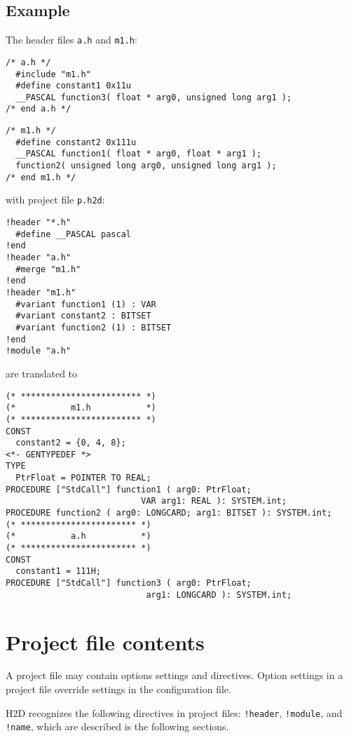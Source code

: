 \subsection*{Example}

The header files {\tt a.h} and {\tt m1.h}:

{\ifonline\else\small\fi
\begin{verbatim}
/* a.h */
  #include "m1.h"
  #define constant1 0x11u
  __PASCAL function3( float * arg0, unsigned long arg1 );
/* end a.h */
\end{verbatim}

\begin{verbatim}
/* m1.h */
  #define constant2 0x111u
  __PASCAL function1( float * arg0, float * arg1 );
  function2( unsigned long arg0, unsigned long arg1 );
/* end m1.h */
\end{verbatim}

with project file {\tt p.h2d}:

\begin{verbatim}
!header "*.h"
  #define __PASCAL pascal
!end
!header "a.h"
  #merge "m1.h"
!end
!header "m1.h"
  #variant function1 (1) : VAR
  #variant constant2 : BITSET
  #variant function2 (1) : BITSET
!end
!module "a.h"
\end{verbatim}

are translated to

\begin{verbatim}
(* ************************ *)
(*           m1.h           *)
(* ************************ *)
CONST
  constant2 = {0, 4, 8};
<*- GENTYPEDEF *>
TYPE
  PtrFloat = POINTER TO REAL;
PROCEDURE ["StdCall"] function1 ( arg0: PtrFloat;
                           VAR arg1: REAL ): SYSTEM.int;
PROCEDURE function2 ( arg0: LONGCARD; arg1: BITSET ): SYSTEM.int;
(* *********************** *)
(*           a.h           *)
(* *********************** *)
CONST
  constant1 = 111H;
PROCEDURE ["StdCall"] function3 ( arg0: PtrFloat;
                            arg1: LONGCARD ): SYSTEM.int;
\end{verbatim}
} %

\section{Project file contents}
\label{project:directives}

A project file may contain options settings and directives.
Option settings in a project file override settings
in the configuration file.

H2D recognizes the following directives in project files:
{\tt !header}, {\tt !module}, and {\tt !name}, which are
described is the following sections.


